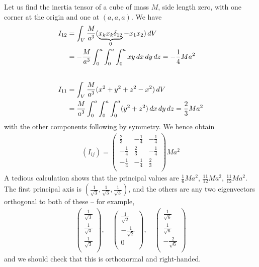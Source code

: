 \documentclass{../template/note}
\begin{document}
    \begin{example*}[hard]
        Let us find the inertia tensor of a cube of mass \(M\), side length zero, with one corner at the origin and one at \((a, a, a)\). We have
        \begin{align*}
            I_{12} &= \int_V \frac{M}{a^3} (\underbrace{x_kx_k\delta_{12}}_0-x_1x_2) \,d{V} \\
            &= -\frac{M}{a^3} \int_0^a \int_0^a \int_0^a xy \,d{x} \,d{y} \,d{z} = -\frac 1 4 Ma^2 \\[20pt]            
            I_{11} &= \int_V \frac{M}{a^3} (x^2+y^2+z^2-x^2) \,d{V} \\
            &= \frac{M}{a^3} \int_0^a \int_0^a \int_0^a (y^2+z^2) \,d{x} \,d{y} \,d{z} = \frac 2 3 Ma^2
        \end{align*}
        with the other components following by symmetry. We hence obtain
        \begin{align*}
            (I_{ij}) = \begin{pmatrix}
                \frac 2 3 & -\frac 1 4 & -\frac 1 4 \\
                -\frac 1 4 & \frac 2 3 & -\frac 1 4 \\
                -\frac 1 4 & -\frac 1 4 & \frac 2 3 \\
            \end{pmatrix}Ma^2
        \end{align*}
        A tedious calculation shows that the principal values are \(\frac 1 6 Ma^2\), \(\frac {11}{12} Ma^2\), \(\frac {11}{12} Ma^2\). The first principal axis is \(\left(\frac 1 {\sqrt 3}, \frac 1 {\sqrt 3}, \frac 1 {\sqrt 3}\right)\), and the others are any two eigenvectors orthogonal to both of these -- for example,
        \begin{align*}
            \begin{pmatrix}
                \frac 1 {\sqrt 3} \\
                \frac 1 {\sqrt 3} \\
                \frac 1 {\sqrt 3} \\
            \end{pmatrix}, \quad \begin{pmatrix}
                \frac 1 {\sqrt 2} \\
                -\frac 1 {\sqrt 2} \\
                0 \\
            \end{pmatrix}, \quad \begin{pmatrix}
                \frac 1 {\sqrt 6} \\
                \frac 1 {\sqrt 6} \\
                -\frac 2 {\sqrt 6} \\
            \end{pmatrix}
        \end{align*}
        and we should check that this is orthonormal and right-handed.


\end{example*}
\end{document}
